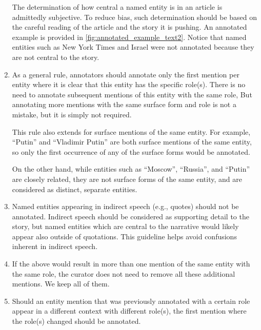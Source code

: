 \begin{enumerate}
The determination of how central a named entity is in an article is admittedly subjective. To reduce bias, such determination should be based on the careful reading of the article and the story it is pushing. An annotated example is provided in \ref{fig:annotated_example_text2}. Notice that named entities such as New York Times and Israel were not annotated because they are not central to the story.
    
    \item As a general rule, annotators should annotate only the first mention per entity where it is clear that this entity has the specific role(s). There is no need to annotate subsequent mentions of this entity with the same role, But  annotating more mentions with the same surface form and role is not a mistake, but it is simply not required.

    This rule also extends for surface mentions of the same entity. For example, ``Putin'' and ``Vladimir Putin'' are both surface mentions of the same entity, so only the first occurrence of any of the surface forms  would be annotated.

    On the other hand, while entities such as ``Moscow'', ``Russia'', and ``Putin'' are closely related, they are not surface forms of the same entity, and are considered as distinct, separate entities.

    \item Named entities appearing in indirect speech (e.g., quotes) should not be annotated. Indirect speech should be considered as supporting detail to the story, but named entities which are central to the narrative would likely appear also outside of quotations. This guideline helps avoid confusions inherent in indirect speech.

    \item If the above would result in more than one mention of the same entity with the same role, the curator does not need to remove all these additional mentions. We keep all of them.
    \item Should an entity mention that was previously annotated with a certain role appear in a different context with different role(s), the first mention where the role(s) changed should be annotated.


\end{enumerate}
